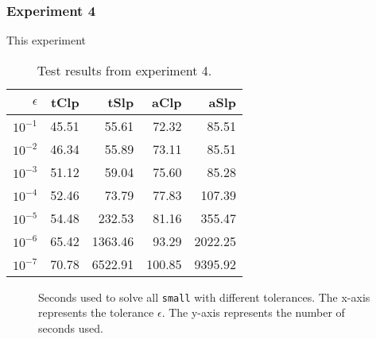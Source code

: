 \subsubsection{Experiment 4}
This experiment 
\begin{table}[ht!]
\centering
\caption{Test results from experiment 4.}
\begin{tabular}{rrrrr}
$\epsilon$ & tClp & tSlp & aClp & aSlp \\ \hline
$10^{-1}$ & 45.51 & 55.61 & 72.32 & 85.51 \\
$10^{-2}$ & 46.34 & 55.89 & 73.11 & 85.51 \\
$10^{-3}$ & 51.12 & 59.04 & 75.60 & 85.28 \\
$10^{-4}$ & 52.46 & 73.79 & 77.83 & 107.39 \\
$10^{-5}$ & 54.48 & 232.53 & 81.16 & 355.47 \\
$10^{-6}$ & 65.42 & 1363.46 & 93.29 & 2022.25 \\
$10^{-7}$ & 70.78 & 6522.91 & 100.85 & 9395.92
\end{tabular}
\label{table:expfour}
\end{table}

\begin{figure}[ht!]
    \centering
    
    \caption{Seconds used to solve all \texttt{small} with different
             tolerances.
             The x-axis represents the tolerance $\epsilon$.
             The y-axis represents the number of seconds used.}
    \label{fig:smalltolerance}
\end{figure}

